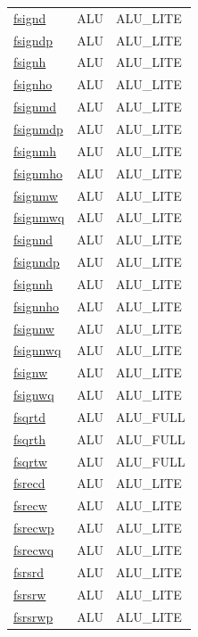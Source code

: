 \begin{small}
\begin{longtable}[l]{l l l}
\hyperlink{lvx.fsignd}{fsignd} & ALU & ALU\_LITE \\ 
\hyperlink{lvx.fsigndp}{fsigndp} & ALU & ALU\_LITE \\ 
\hyperlink{lvx.fsignh}{fsignh} & ALU & ALU\_LITE \\ 
\hyperlink{lvx.fsignho}{fsignho} & ALU & ALU\_LITE \\ 
\hyperlink{lvx.fsignmd}{fsignmd} & ALU & ALU\_LITE \\ 
\hyperlink{lvx.fsignmdp}{fsignmdp} & ALU & ALU\_LITE \\ 
\hyperlink{lvx.fsignmh}{fsignmh} & ALU & ALU\_LITE \\ 
\hyperlink{lvx.fsignmho}{fsignmho} & ALU & ALU\_LITE \\ 
\hyperlink{lvx.fsignmw}{fsignmw} & ALU & ALU\_LITE \\ 
\hyperlink{lvx.fsignmwq}{fsignmwq} & ALU & ALU\_LITE \\ 
\hyperlink{lvx.fsignnd}{fsignnd} & ALU & ALU\_LITE \\ 
\hyperlink{lvx.fsignndp}{fsignndp} & ALU & ALU\_LITE \\ 
\hyperlink{lvx.fsignnh}{fsignnh} & ALU & ALU\_LITE \\ 
\hyperlink{lvx.fsignnho}{fsignnho} & ALU & ALU\_LITE \\ 
\hyperlink{lvx.fsignnw}{fsignnw} & ALU & ALU\_LITE \\ 
\hyperlink{lvx.fsignnwq}{fsignnwq} & ALU & ALU\_LITE \\ 
\hyperlink{lvx.fsignw}{fsignw} & ALU & ALU\_LITE \\ 
\hyperlink{lvx.fsignwq}{fsignwq} & ALU & ALU\_LITE \\ 
\hyperlink{lvx.fsqrtd}{fsqrtd} & ALU & ALU\_FULL \\ 
\hyperlink{lvx.fsqrth}{fsqrth} & ALU & ALU\_FULL \\ 
\hyperlink{lvx.fsqrtw}{fsqrtw} & ALU & ALU\_FULL \\ 
\hyperlink{lvx.fsrecd}{fsrecd} & ALU & ALU\_LITE \\ 
\hyperlink{lvx.fsrecw}{fsrecw} & ALU & ALU\_LITE \\ 
\hyperlink{lvx.fsrecwp}{fsrecwp} & ALU & ALU\_LITE \\ 
\hyperlink{lvx.fsrecwq}{fsrecwq} & ALU & ALU\_LITE \\ 
\hyperlink{lvx.fsrsrd}{fsrsrd} & ALU & ALU\_LITE \\ 
\hyperlink{lvx.fsrsrw}{fsrsrw} & ALU & ALU\_LITE \\ 
\hyperlink{lvx.fsrsrwp}{fsrsrwp} & ALU & ALU\_LITE \\ 

\end{longtable}
\end{small}

